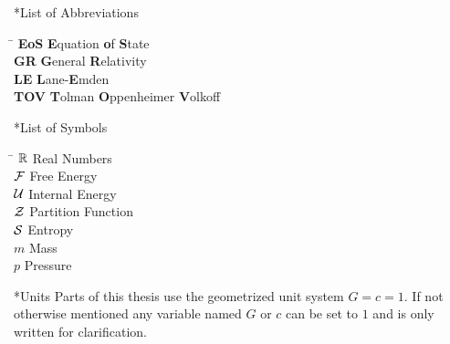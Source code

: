 \thispagestyle{empty}
\begin{section}*{List of Abbreviations}
\begin{tabbing}
\hspace{2cm}\= \kill
\textbf{EoS}        \> \textbf{E}quation \textbf{o}f \textbf{S}tate\\
\textbf{GR} 		\> \textbf{G}eneral \textbf{R}elativity \\
\textbf{LE}			\> \textbf{L}ane-\textbf{E}mden\\
\textbf{TOV}		\> \textbf {T}olman \textbf{O}ppenheimer \textbf{V}olkoff


\end{tabbing}


\end{section}
\begin{section}*{List of Symbols}
\begin{tabbing}
\hspace{2cm}\=\kill
$\mathbb{R}$				\> Real Numbers\\
$\mathcal{F}$				\> Free Energy\\
$\mathcal{U}$				\> Internal Energy\\
$\mathcal{Z}$				\> Partition Function\\
$\mathcal{S}$				\> Entropy\\
$m$					\> Mass\\
$p$					\> Pressure
\end{tabbing}

\end{section}

\begin{section}*{Units}
Parts of this thesis use the geometrized unit system $G=c=1$. If not otherwise mentioned any variable named $G$ or $c$ can be set to $1$ and is only written for clarification.
\end{section}
